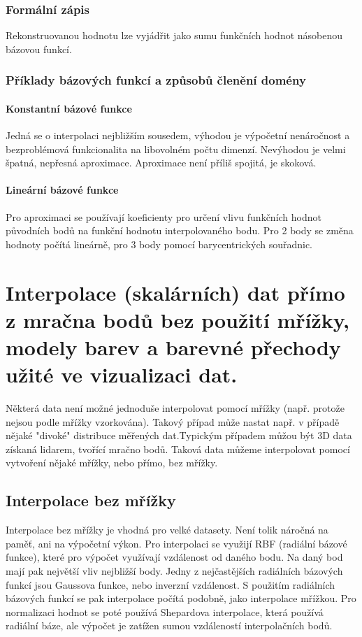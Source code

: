 \documentclass[10pt,a4paper, table]{article}
\begin{document}
\subsubsection{Formální zápis}
Rekonstruovanou hodnotu lze vyjádřit jako sumu funkčních hodnot násobenou bázovou funkcí.

\subsubsection{Příklady bázových funkcí a způsobů členění domény}

\paragraph{Konstantní bázové funkce}
Jedná se o interpolaci nejbližším sousedem, výhodou je výpočetní nenáročnost a bezproblémová funkcionalita na libovolném počtu dimenzí. Nevýhodou je velmi špatná, nepřesná aproximace. Aproximace není příliš spojitá, je skoková.

\paragraph{Lineární bázové funkce}
Pro aproximaci se používají koeficienty pro určení vlivu funkčních hodnot původních bodů na funkční hodnotu interpolovaného bodu. Pro 2 body se změna hodnoty počítá lineárně, pro 3 body pomocí barycentrických souřadnic.

\clearpage
\section{Interpolace (skalárních) dat přímo z mračna bodů bez použití mřížky, modely barev a barevné přechody užité ve vizualizaci dat.}
Některá data není možné jednoduše interpolovat pomocí mřížky (např. protože nejsou podle mřížky vzorkována). Takový případ může nastat např. v případě nějaké "divoké" distribuce měřených dat.Typickým případem můžou být 3D data získaná lidarem, tvořící mračno bodů. Taková data můžeme interpolovat pomocí vytvoření nějaké mřížky, nebo přímo, bez mřížky.
\subsection{Interpolace bez mřížky}
Interpolace bez mřížky je vhodná pro velké datasety. Není tolik náročná na paměť, ani na výpočetní výkon. Pro interpolaci se využijí RBF (radiální bázové funkce), které pro výpočet využívají vzdálenost od daného bodu. Na daný bod mají pak největší vliv nejbližší body. Jedny z nejčastějších  radiálních bázových funkcí jsou Gaussova funkce, nebo inverzní vzdálenost. S použitím radiálních bázových funkcí se pak interpolace počítá podobně, jako interpolace mřížkou. Pro normalizaci hodnot se poté používá Shepardova interpolace, která používá radiální báze, ale výpočet je zatížen sumou vzdáleností interpolačních bodů.
\end{document}
